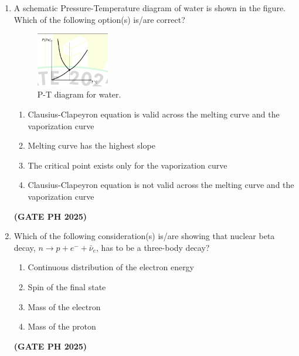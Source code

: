 \documentclass[14pt, a4paper]{extarticle}
\begin{document}
\begin{enumerate}[label=\textbf{Q.\arabic*}]
\item A schematic Pressure-Temperature diagram of water is shown in the figure. Which of the following option(s) is/are correct?
\begin{figure}[H]
\centering
\includegraphics[width=0.3\textwidth]{figs/q26fig25.png}
\caption{P-T diagram for water.}
\label{fig:q26_pt_diagram}
\end{figure}
\begin{enumerate}
\item Clausius-Clapeyron equation is valid across the melting curve and the vaporization curve
\item Melting curve has the highest slope
\item The critical point exists only for the vaporization curve
\item Clausius-Clapeyron equation is not valid across the melting curve and the vaporization curve
\end{enumerate}
\hfill \textbf{(GATE PH 2025)}

\item Which of the following consideration(s) is/are showing that nuclear beta decay, $n \to p + e^- + \bar{\nu}_e$, has to be a three-body decay?
\begin{enumerate}
\item Continuous distribution of the electron energy
\item Spin of the final state
\item Mass of the electron
\item Mass of the proton
\end{enumerate}
\hfill \textbf{(GATE PH 2025)}


\end{enumerate}
\end{document}

